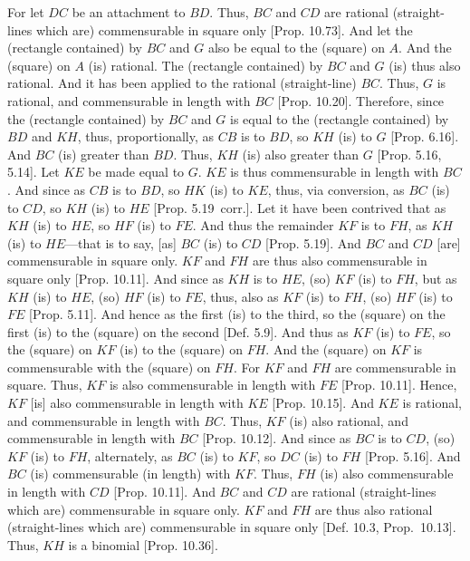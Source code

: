 \begin{Parallel}{}{}
{For let $DC$ be an attachment to $BD$. Thus, $BC$ and $CD$
are rational (straight-lines which are) commensurable in square only [Prop. 10.73]. And let the (rectangle contained)
by $BC$ and $G$ also be equal to the (square) on $A$. And the (square)
on $A$ (is) rational. The (rectangle contained) by $BC$ and $G$ (is) thus also rational. And it has been applied to the rational (straight-line) $BC$.
Thus, $G$ is rational, and commensurable in length with $BC$ [Prop. 10.20]. Therefore, since the (rectangle contained) by $BC$ and $G$ is equal to the (rectangle contained) by
$BD$ and $KH$, thus, proportionally, as $CB$ is to $BD$, so $KH$ (is) to
$G$ [Prop. 6.16]. And $BC$ (is) greater than $BD$.
Thus, $KH$ (is) also greater than $G$ [Prop. 5.16,
5.14]. Let $KE$ be made equal to $G$.
$KE$ is thus commensurable in length with $BC$. And since as
$CB$ is to $BD$, so $HK$ (is) to $KE$, thus, via conversion, as
$BC$ (is) to $CD$, so $KH$ (is) to $HE$ [Prop. 5.19~corr.]. 
Let it have been contrived that as
$KH$ (is) to $HE$, so $HF$ (is) to $FE$. And thus the remainder $KF$ is to
$FH$, as $KH$ (is) to $HE$---that is to say, [as] $BC$ (is) to $CD$
[Prop. 5.19]. And $BC$ and $CD$
[are] commensurable in square only. $KF$ and $FH$ are thus also commensurable in square only [Prop. 10.11].
And since as $KH$ is to $HE$, (so) $KF$ (is) to $FH$, but as $KH$
(is) to $HE$, (so) $HF$ (is) to $FE$, thus, also as $KF$ (is) to $FH$, (so)
$HF$ (is) to $FE$ [Prop. 5.11].
And hence as the first (is) to the third,
so the (square) on the first (is) to the (square) on the second [Def. 5.9].  And thus as $KF$ (is) to $FE$, so the (square) on $KF$ (is) to the (square) on $FH$. And the (square) on $KF$
is commensurable with the (square) on $FH$. For $KF$ and $FH$
are commensurable in square. Thus, $KF$ is also commensurable
in length with  $FE$ [Prop. 10.11]. 
 Hence, $KF$ [is] also commensurable in length with $KE$
  [Prop. 10.15]. And $KE$ is rational,
and commensurable in length with $BC$.  Thus, $KF$ (is) also rational,
and commensurable in length with $BC$ [Prop. 10.12].  And since as $BC$ is to
$CD$, (so)
$KF$ (is) to $FH$, alternately, as $BC$ (is) to $KF$, so $DC$
(is) to $FH$ [Prop. 5.16]. And $BC$ (is) commensurable (in length) with $KF$. Thus, $FH$ (is) also commensurable in length with $CD$ [Prop. 10.11]. And
$BC$ and $CD$ are rational (straight-lines which are) commensurable
in square only. $KF$ and $FH$ are thus also rational (straight-lines which
are) commensurable in square only [Def. 10.3, Prop.~10.13]. Thus, $KH$ is a binomial [Prop. 10.36].

}
\end{Parallel}

